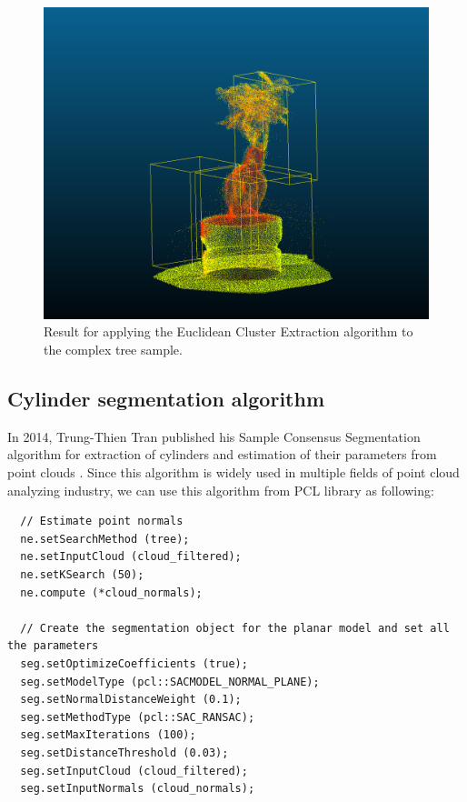 \documentclass[runningheads,a4paper]{llncs}
\begin{document}
\begin{figure}
\centering
\includegraphics[scale=0.6]{Euclidean-cluster-extraction-result.png}
\caption{Result for applying the Euclidean Cluster Extraction algorithm to the complex tree sample.}
\label{fig:Euclidean-cluster}
\end{figure}

\subsection{Cylinder segmentation algorithm}
In 2014, Trung-Thien Tran published his Sample Consensus Segmentation algorithm for extraction of cylinders and estimation of their parameters from point clouds \cite{7}. Since this algorithm is widely used in multiple fields of point cloud analyzing industry, we can use this algorithm from PCL library as following:
\begin{lstlisting}
  // Estimate point normals
  ne.setSearchMethod (tree);
  ne.setInputCloud (cloud_filtered);
  ne.setKSearch (50);
  ne.compute (*cloud_normals);

  // Create the segmentation object for the planar model and set all the parameters
  seg.setOptimizeCoefficients (true);
  seg.setModelType (pcl::SACMODEL_NORMAL_PLANE);
  seg.setNormalDistanceWeight (0.1);
  seg.setMethodType (pcl::SAC_RANSAC);
  seg.setMaxIterations (100);
  seg.setDistanceThreshold (0.03);
  seg.setInputCloud (cloud_filtered);
  seg.setInputNormals (cloud_normals);
\end{lstlisting}
\end{document}
